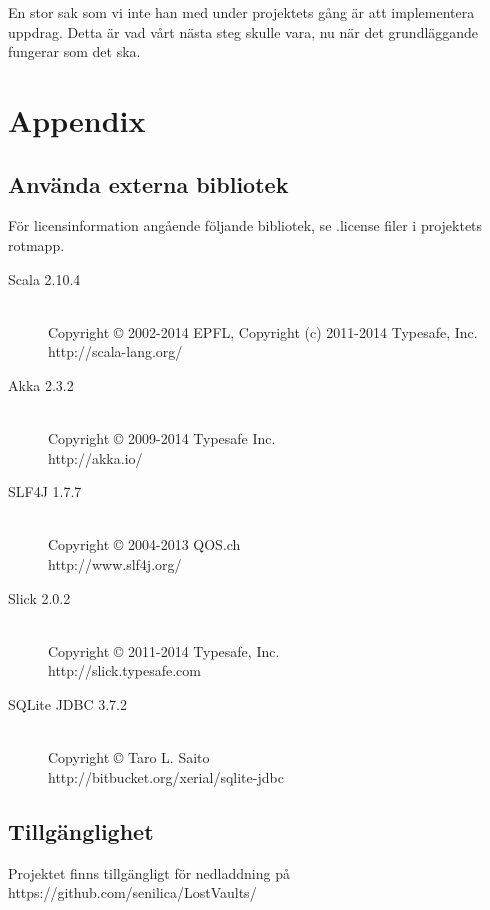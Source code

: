 \documentclass[a4paper]{article}
\begin{document}
En stor sak som vi inte han med under projektets gång är att implementera uppdrag. Detta är vad vårt nästa steg skulle vara, nu när det grundläggande fungerar som det ska. 

\section{Appendix}
\subsection{Använda externa bibliotek}
För licensinformation angående följande bibliotek, se .license filer i projektets rotmapp.
\begin{description}
\item[Scala 2.10.4] \hfill \\ Copyright © 2002-2014 EPFL, Copyright (c) 2011-2014 Typesafe, Inc.\hfill \\http://scala-lang.org/
\item[Akka 2.3.2] \hfill \\ Copyright © 2009-2014 Typesafe Inc.\hfill \\ http://akka.io/
\item[SLF4J 1.7.7] \hfill \\ Copyright © 2004-2013 QOS.ch\hfill \\ http://www.slf4j.org/
\item[Slick 2.0.2] \hfill \\ Copyright © 2011-2014 Typesafe, Inc.\hfill \\ http://slick.typesafe.com
\item[SQLite JDBC 3.7.2] \hfill \\ Copyright © Taro L. Saito\hfill \\ http://bitbucket.org/xerial/sqlite-jdbc
\end{description}

\subsection{Tillgänglighet}
Projektet finns tillgängligt för nedladdning på https://github.com/senilica/LostVaults/
\end{document}
